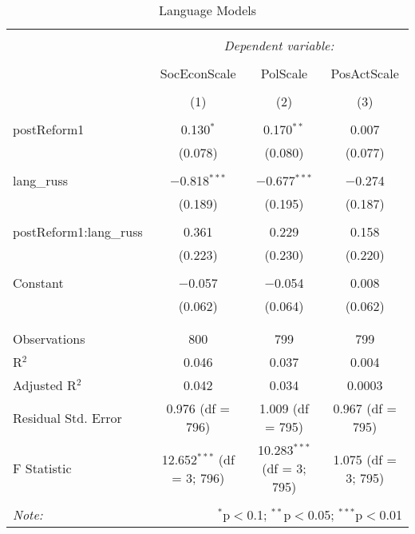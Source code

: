 
\begin{table}[!htbp] \centering 
  \caption{Language Models} 
  \label{} 
\begin{tabular}{@{\extracolsep{5pt}}lccc} 
\\[-1.8ex]\hline 
\hline \\[-1.8ex] 
 & \multicolumn{3}{c}{\textit{Dependent variable:}} \\ 
\cline{2-4} 
\\[-1.8ex] & SocEconScale & PolScale & PosActScale \\ 
\\[-1.8ex] & (1) & (2) & (3)\\ 
\hline \\[-1.8ex] 
 postReform1 & 0.130$^{*}$ & 0.170$^{**}$ & 0.007 \\ 
  & (0.078) & (0.080) & (0.077) \\ 
  & & & \\ 
 lang\_russ & $-$0.818$^{***}$ & $-$0.677$^{***}$ & $-$0.274 \\ 
  & (0.189) & (0.195) & (0.187) \\ 
  & & & \\ 
 postReform1:lang\_russ & 0.361 & 0.229 & 0.158 \\ 
  & (0.223) & (0.230) & (0.220) \\ 
  & & & \\ 
 Constant & $-$0.057 & $-$0.054 & 0.008 \\ 
  & (0.062) & (0.064) & (0.062) \\ 
  & & & \\ 
\hline \\[-1.8ex] 
Observations & 800 & 799 & 799 \\ 
R$^{2}$ & 0.046 & 0.037 & 0.004 \\ 
Adjusted R$^{2}$ & 0.042 & 0.034 & 0.0003 \\ 
Residual Std. Error & 0.976 (df = 796) & 1.009 (df = 795) & 0.967 (df = 795) \\ 
F Statistic & 12.652$^{***}$ (df = 3; 796) & 10.283$^{***}$ (df = 3; 795) & 1.075 (df = 3; 795) \\ 
\hline 
\hline \\[-1.8ex] 
\textit{Note:}  & \multicolumn{3}{r}{$^{*}$p$<$0.1; $^{**}$p$<$0.05; $^{***}$p$<$0.01} \\ 
\end{tabular} 
\end{table} 
